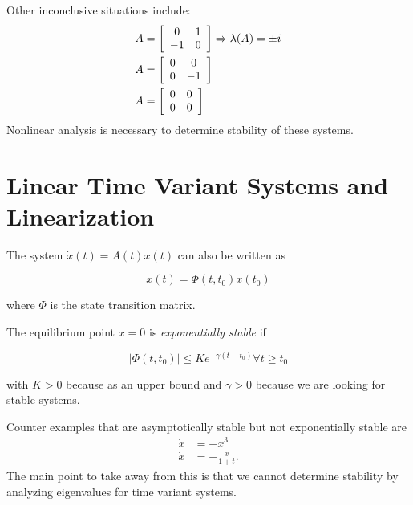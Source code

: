 Other inconclusive situations include:
\begin{align*}
A &= \left[\begin{array}{c c} 0 & 1 \\ -1 & 0 \end{array}\right] \Rightarrow\lambda(A)=\pm{}i \\
A &= \left[\begin{array}{c c} 0 & 0 \\ 0 & -1 \end{array}\right] \\
A &= \left[\begin{array}{c c} 0 & 0 \\ 0 & 0 \end{array}\right]
\end{align*}
Nonlinear analysis is necessary to determine stability of these systems.

\section{Linear Time Variant Systems and Linearization}
The system $\dot{x}(t) = A(t)x(t)$ can also be written as

\begin{equation*}
x(t) = \Phi(t,t_0)x(t_0)
\end{equation*}

where $\Phi$ is the state transition matrix.

\begin{definition}
The equilibrium point $x=0$ is \textit{exponentially stable} if

\begin{equation*}
|\Phi(t,t_0)| \leq Ke^{-\gamma(t-t_0)} \forall t\geq t_0
\end{equation*}

with $K>0$ because as an upper bound and $\gamma>0$ because we are looking for stable systems.
\end{definition}

Counter examples that are asymptotically stable but not exponentially stable are
\begin{align*}
\dot{x} &= -x^3 \\
\dot{x} &= -\frac{x}{1+t}.
\end{align*}
The main point to take away from this is that we cannot determine stability by analyzing eigenvalues for time variant systems.

